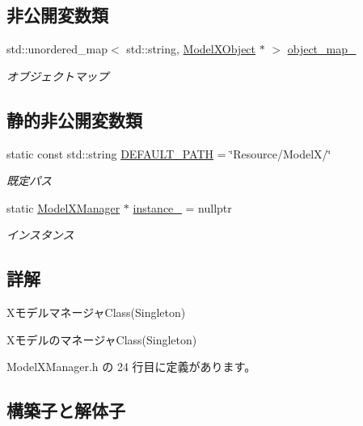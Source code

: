 \subsection*{非公開変数類}
\begin{DoxyCompactItemize}
\item 
std\+::unordered\+\_\+map$<$ std\+::string, \mbox{\hyperlink{class_model_x_object}{Model\+X\+Object}} $\ast$ $>$ \mbox{\hyperlink{class_model_x_manager_ac3a90eea2890ea233f6f8c909f705e16}{object\+\_\+map\+\_\+}}
\begin{DoxyCompactList}\small\item\em オブジェクトマップ \end{DoxyCompactList}\end{DoxyCompactItemize}
\subsection*{静的非公開変数類}
\begin{DoxyCompactItemize}
\item 
static const std\+::string \mbox{\hyperlink{class_model_x_manager_a745ad339e5fc73cec28d205881a969f8}{D\+E\+F\+A\+U\+L\+T\+\_\+\+P\+A\+TH}} = \char`\"{}Resource/ModelX/\char`\"{}
\begin{DoxyCompactList}\small\item\em 既定パス \end{DoxyCompactList}\item 
static \mbox{\hyperlink{class_model_x_manager}{Model\+X\+Manager}} $\ast$ \mbox{\hyperlink{class_model_x_manager_a8631ef7e11e9c92e3af008acfceb35d7}{instance\+\_\+}} = nullptr
\begin{DoxyCompactList}\small\item\em インスタンス \end{DoxyCompactList}\end{DoxyCompactItemize}


\subsection{詳解}
Xモデルマネージャ\+Class(\+Singleton) 

Xモデルのマネージャ\+Class(\+Singleton) 

 Model\+X\+Manager.\+h の 24 行目に定義があります。



\subsection{構築子と解体子}
\mbox{\label{class_model_x_manager_aa9add853f72deb575e332f39c3373624}} 
